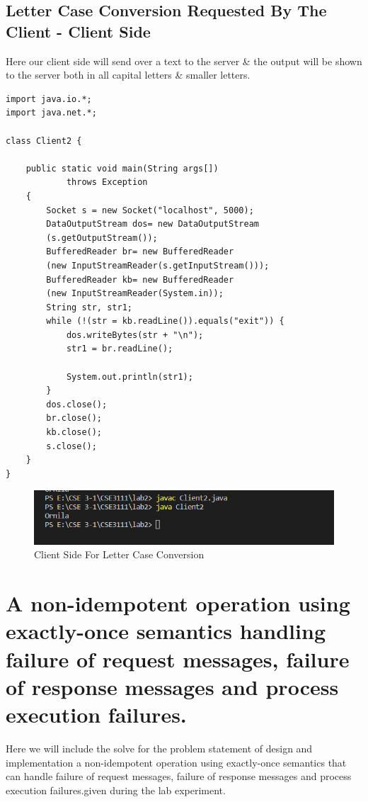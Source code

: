 \documentclass[11pt]{article}
\begin{document}
\subsection{Letter Case Conversion Requested By The Client - Client Side}
Here our client side will send over a text to the server & the output will be shown to the server both in all capital letters & smaller letters. 
\
\begin{verbatim}
import java.io.*;
import java.net.*;

class Client2 {

    public static void main(String args[])
            throws Exception
    {
        Socket s = new Socket("localhost", 5000);
        DataOutputStream dos= new DataOutputStream
        (s.getOutputStream());
        BufferedReader br= new BufferedReader
        (new InputStreamReader(s.getInputStream()));
        BufferedReader kb= new BufferedReader
        (new InputStreamReader(System.in));
        String str, str1;
        while (!(str = kb.readLine()).equals("exit")) {
            dos.writeBytes(str + "\n");
            str1 = br.readLine();

            System.out.println(str1);
        }
        dos.close();
        br.close();
        kb.close();
        s.close();
    }
}
\end{verbatim}

\begin{figure}[!h]
\centering
\includegraphics[width=\textwidth]{case_client.png}
\caption{Client Side For Letter Case Conversion}
\end{figure}

\section{A non-idempotent operation using exactly-once semantics handling failure of request messages, failure of response messages and process execution failures.}
Here we will include the solve for the problem statement of design and implementation a non-idempotent operation using exactly-once semantics that can handle failure of request messages, failure of response messages and process execution failures.given during the lab experiment.
\end{document}
